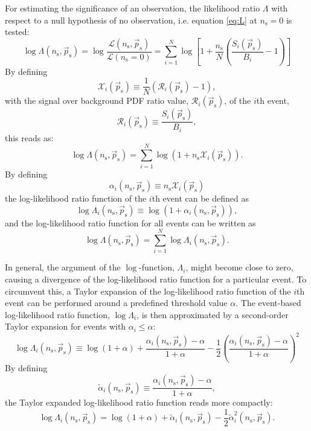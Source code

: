 \documentclass{article}
\newcommand{\ns}{n_{\mathrm{s}}}
\newcommand{\ps}{\vec{p}_{\mathrm{s}}}
\begin{document}
For estimating the significance of an observation, the likelihood ratio
$\Lambda$ with respect to a null hypothesis of no observation, i.e.
equation \ref{eq:L} at $\ns=0$ is tested:
\begin{equation}
 \log \Lambda(\ns,\ps) = \log \frac{\mathcal{L}(\ns,\ps)}{\mathcal{L}(\ns=0)} = \sum_{i=1}^{N} \log \left[ 1 + \frac{\ns}{N}\left( \frac{S_i(\ps)}{B_i} - 1 \right) \right]
\label{eq:logLambda}
\end{equation}
By defining
\begin{equation}
\mathcal{X}_i(\ps) \equiv \frac{1}{N}\left( \mathcal{R}_i(\ps) - 1 \right),
\label{eq:Xi}
\end{equation}
with the signal over background PDF ratio value, $\mathcal{R}_{i}(\ps)$, of the
$i$th event,
\begin{equation}
 \mathcal{R}_i(\ps) \equiv \frac{S_i(\ps)}{B_i},
\end{equation}
this reads as:
\begin{equation}
 \log \Lambda(\ns,\ps) = \sum_{i=1}^{N} \log (1 + \ns\mathcal{X}_i(\ps)).
 \label{eq:logLambdaOfX}
\end{equation}
By defining
\begin{equation}
 \alpha_i(\ns,\ps) \equiv \ns \mathcal{X}_i(\ps)
\end{equation}
the log-likelihood ratio function of the $i$th event can be defined as
\begin{equation}
 \log \Lambda_i(\ns,\ps) \equiv \log(1 + \alpha_i(\ns, \ps)),
 \label{eq:logLambdaiOfalphai}
\end{equation}
and the log-likelihood ratio function for all events can be written as
\begin{equation}
 \log \Lambda(\ns,\ps) = \sum_{i=1}^{N} \log \Lambda_i(\ns,\ps).
 \label{eq:logLambdaOflogLambdai}
\end{equation}

In general, the argument of the $\log$-function, $\Lambda_i$, might become close
to zero, causing a divergence of the log-likelihood ratio function for a particular event.
To circumvent this, a Taylor expansion of the
log-likelihood ratio function of the $i$th event can be performed around a
predefined threshold value $\alpha$.
The event-based log-likelihood ratio function, $\log \Lambda_i$, is then
approximated by a second-order Taylor expansion for events with $\alpha_i \leq \alpha$:
\begin{equation}
 \log\Lambda_i(\ns,\ps) \equiv \log(1 + \alpha) + \frac{\alpha_i(\ns,\ps) - \alpha}{1 + \alpha} - \frac{1}{2} \left(\frac{\alpha_i(\ns,\ps) - \alpha}{1 + \alpha}\right)^2
 \label{eq:logLambdaiTaylor}
\end{equation}
By defining
\begin{equation}
 \tilde{\alpha}_i(\ns,\ps) \equiv \frac{\alpha_i(\ns,\ps) - \alpha}{1 + \alpha},
\end{equation}
the Taylor expanded log-likelihood ratio function reads more compactly:
\begin{equation}
 \log\Lambda_i(\ns,\ps) = \log(1 + \alpha) + \tilde{\alpha}_i(\ns,\ps) - \frac{1}{2} \tilde{\alpha}_i^2(\ns,\ps).
 \label{eq:logLambdaiTaylorOfTildeAlpha}
\end{equation}
\end{document}
